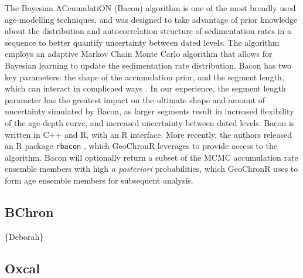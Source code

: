 \documentclass[gc, manuscript]{copernicus}
\begin{document}
The Bayesian ACcumulatiON (Bacon) algorithm \citep{bacon} is one of the most broadly used age-modelling techniques, and was designed to take advantage of prior knowledge about the distribution and autocorrelation structure of sedimentation rates in a sequence to better quantify uncertainty between dated levels.
The algorithm employs an adaptive Markov Chain Monte Carlo algorithm that allows for Bayesian learning to update the sedimentation rate distribution.
Bacon has two key parameters: the shape of the accumulation prior, and the segment length, which can interact in complicaed ways \citep{trachsel2017}.
In our experience, the segment length parameter has the greatest impact on the ultimate shape and amount of uncertainty simulated by Bacon, as larger segments result in increased flexibility of the age-depth curve, and increased uncertainty between dated levels.
Bacon is written in C++ and R, with an R interface.
More recently, the authors released an R package \texttt{rbacon} \citep{baconPackage}, which GeoChronR leverages to provide access to the algorithm.
Bacon will optionally return a subset of the MCMC accumulation rate ensemble members with high \emph{a posteriori} probabilities, which GeoChronR uses to form age ensemble members for subsequent analysis.

\subsection{BChron}

\{Deborah\}

\subsection{Oxcal}
\end{document}
